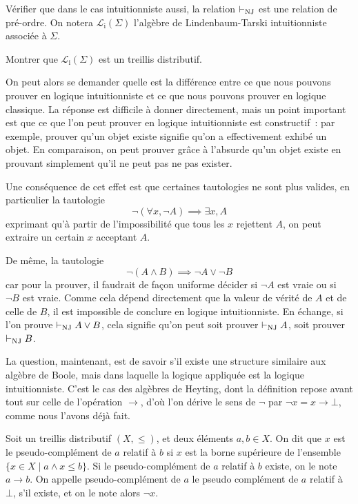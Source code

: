 \begin{exercise}
  Vérifier que dans le cas intuitionniste aussi, la relation $\vdash_{\operatorname{NJ}}$ est une
  relation de pré-ordre. On notera $\mathcal L_\mathrm i(\Sigma)$ l'algèbre de
  Lindenbaum-Tarski intuitionniste associée à $\Sigma$.
\end{exercise}

\begin{exercise}
  Montrer que $\mathcal L_\mathrm i(\Sigma)$ est un treillis distributif.
\end{exercise}

On peut alors se demander quelle est la différence entre ce que nous pouvons
prouver en logique intuitionniste et ce que nous pouvons prouver en logique
classique. La réponse est difficile à donner directement, mais un point
important est que ce que l'on peut prouver en logique intuitionniste est
constructif~: par exemple, prouver qu'un objet existe signifie qu'on a
effectivement exhibé un objet. En comparaison, on peut prouver grâce à l'absurde
qu'un objet existe en prouvant simplement qu'il ne peut pas ne pas exister.

Une conséquence de cet effet est que certaines tautologies ne sont plus valides,
en particulier la tautologie
\[\lnot(\forall x, \lnot A) \implies \exists x, A\]
exprimant qu'à partir de l'impossibilité que tous les $x$ rejettent $A$, on peut
extraire un certain $x$ acceptant $A$.

De même, la tautologie
\[\lnot (A \land B) \implies \lnot A \lor \lnot B\]
car pour la prouver, il faudrait de façon uniforme décider si $\lnot A$ est
vraie ou si $\lnot B$ est vraie. Comme cela dépend directement que la valeur de
vérité de $A$ et de celle de $B$, il est impossible de conclure en logique
intuitionniste. En échange, si l'on prouve $\vdash_{\operatorname{NJ}} A \lor B$, cela signifie qu'on
peut soit prouver $\vdash_{\operatorname{NJ}} A$, soit prouver $\vdash_{\operatorname{NJ}} B$.

La question, maintenant, est de savoir s'il existe une structure similaire aux
algèbre de Boole, mais dans laquelle la logique appliquée est la logique
intuitionniste. C'est le cas des algèbres de Heyting, dont la définition repose
avant tout sur celle de l'opération $\to$, d'où l'on dérive le sens de $\lnot$
par $\lnot x = x \to \bot$, comme nous l'avons déjà fait.

\begin{definition}
  Soit un treillis distributif $(X,\leq)$, et deux éléments $a,b\in X$. On dit
  que $x$ est le pseudo-complément de $a$ relatif à $b$ si $x$ est la borne
  supérieure de l'ensemble $\{x \in X \mid a \land x \leq b\}$. Si le
  pseudo-complément de $a$ relatif à $b$ existe, on le note $a\to b$. On appelle
  pseudo-complément de $a$ le pseudo complément de $a$ relatif à $\bot$, s'il
  existe, et on le note alors $\lnot x$.
\end{definition}

